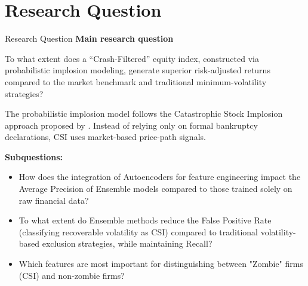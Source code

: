 \documentclass[10pt]{beamer}\usepackage[]{graphicx}\usepackage[table]{xcolor}
\begin{document}

\section{Research Question}
\begin{frame}{Research Question}
\small
\textbf{Main research question}
\begin{alertblock}{}
To what extent does a ``Crash-Filtered'' equity index, constructed via probabilistic implosion modeling, generate superior risk-adjusted returns compared to the market benchmark and traditional minimum-volatility strategies?
\end{alertblock}

The probabilistic implosion model follows the Catastrophic Stock Implosion approach proposed by \citet{Tewari2024}. Instead of relying only on formal bankruptcy declarations, CSI uses market-based price-path signals.

\vspace{0.35em}

\textbf{Subquestions:}

  \begin{itemize}
      \setlength\itemsep{0.3em}
    \item How does the integration of Autoencoders for feature engineering impact the Average Precision of Ensemble models compared to those trained solely on raw financial data?

    \item To what extent do Ensemble methods reduce the False Positive Rate (classifying recoverable volatility as CSI) compared to traditional volatility-based exclusion strategies, while maintaining Recall?

    \item Which features are most important for distinguishing between "Zombie" firms (CSI) and non-zombie firms?

  \end{itemize}


\end{frame}

\end{document}
